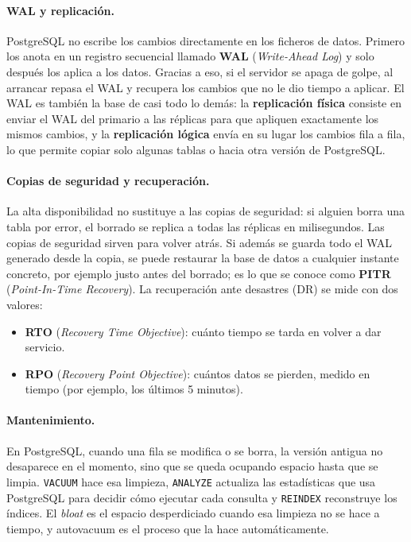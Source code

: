 \documentclass[11pt, a4paper, titlepage]{article}
\newcommand{\cod}[1]{\texttt{#1}}
\begin{document}
\paragraph{WAL y replicación.} PostgreSQL no escribe los cambios directamente en los ficheros de datos. Primero los anota en un registro secuencial llamado \textbf{WAL} (\textit{Write-Ahead Log}) y solo después los aplica a los datos. Gracias a eso, si el servidor se apaga de golpe, al arrancar repasa el WAL y recupera los cambios que no le dio tiempo a aplicar. El WAL es también la base de casi todo lo demás: la \textbf{replicación física} consiste en enviar el WAL del primario a las réplicas para que apliquen exactamente los mismos cambios, y la \textbf{replicación lógica} envía en su lugar los cambios fila a fila, lo que permite copiar solo algunas tablas o hacia otra versión de PostgreSQL.

\paragraph{Copias de seguridad y recuperación.} La alta disponibilidad no sustituye a las copias de seguridad: si alguien borra una tabla por error, el borrado se replica a todas las réplicas en milisegundos. Las copias de seguridad sirven para volver atrás. Si además se guarda todo el WAL generado desde la copia, se puede restaurar la base de datos a cualquier instante concreto, por ejemplo justo antes del borrado; es lo que se conoce como \textbf{PITR} (\textit{Point-In-Time Recovery}). La recuperación ante desastres (DR) se mide con dos valores:
\begin{itemize}
    \item \textbf{RTO} (\textit{Recovery Time Objective}): cuánto tiempo se tarda en volver a dar servicio.
    \item \textbf{RPO} (\textit{Recovery Point Objective}): cuántos datos se pierden, medido en tiempo (por ejemplo, los últimos 5 minutos).
\end{itemize}

\paragraph{Mantenimiento.} En PostgreSQL, cuando una fila se modifica o se borra, la versión antigua no desaparece en el momento, sino que se queda ocupando espacio hasta que se limpia. \cod{VACUUM} hace esa limpieza, \cod{ANALYZE} actualiza las estadísticas que usa PostgreSQL para decidir cómo ejecutar cada consulta y \cod{REINDEX} reconstruye los índices. El \textit{bloat} es el espacio desperdiciado cuando esa limpieza no se hace a tiempo, y autovacuum es el proceso que la hace automáticamente.
\end{document}
